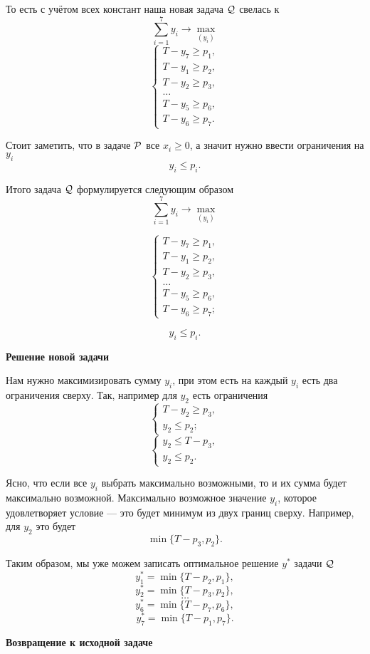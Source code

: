 То есть с учётом всех констант наша новая задача $\Q$ свелась к
\[
\sum_{i=1}^7 y_i \to \max_{(y_i)}
\]
\[
\begin{cases}
	T - y_7 \ge p_1, \\
	T - y_1 \ge p_2, \\
	T - y_2 \ge p_3, \\
	\dots \\
	T - y_5 \ge p_6, \\
	T - y_6 \ge p_7.
\end{cases}
\]

Стоит заметить, что в задаче $\P$ все $x_i \ge 0$, а значит нужно ввести ограничения на $y_i$
\[
	y_i \le p_i.
\]

Итого задача $\Q$ формулируется следующим образом
\[
\sum_{i=1}^7 y_i \to \max_{(y_i)}
\]

\[
\begin{cases}
	T - y_7 \ge p_1, \\
	T - y_1 \ge p_2, \\
	T - y_2 \ge p_3, \\
	\dots \\
	T - y_5 \ge p_6, \\
	T - y_6 \ge p_7;
\end{cases}
\]

\[
y_i \le p_i.
\]

\textbf{Решение новой задачи}

Нам нужно максимизировать сумму $y_i$, при этом есть на каждый $y_i$ есть два ограничения сверху. Так, например для $y_2$ есть ограничения
\[
	\begin{cases}
		T - y_2 \ge p_3, \\
		y_2 \le p_2;
	\end{cases}
\]
\[
\begin{cases}
	y_2 \le T - p_3, \\
	y_2 \le p_2.
\end{cases}
\]

Ясно, что если все $y_i$ выбрать максимально возможными, то и их сумма будет максимально возможной. Максимально возможное значение $y_i$, которое удовлетворяет условие --- это будет минимум из двух границ сверху. Например, для $y_2$ это будет
\[
	\min\{T - p_3, p_2\}.
\]

Таким образом, мы уже можем записать оптимальное решение $y^*$ задачи $\Q$
\[
y_1^* = \min\{T - p_2, p_1\},
\]
\[
y_2^* = \min\{T - p_3, p_2\},
\]
\[
\dots
\]
\[
y_6^* = \min\{T - p_7, p_6\},
\]
\[
y_7^* = \min\{T - p_1, p_7\}.
\]

\textbf{Возвращение к исходной задаче}

